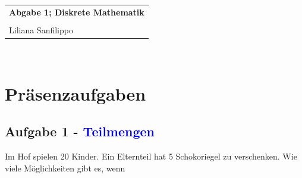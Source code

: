 \documentclass{article} %
\newcommand{\titulo}{Abgabe 1; Diskrete Mathematik}
\newcommand{\nombre}{Liliana Sanfilippo}
\begin{document}
\begin{tabular}{p{12cm}}
{{\Large\bf\titulo}}\\
\vspace{0.2cm}\\
 {\large\nombre}\\
\end{tabular}
\vspace{0.2cm}\\
\section{Präsenzaufgaben}



\subsection{Aufgabe 1 - \textcolor{blue}{Teilmengen}}
Im Hof spielen 20 Kinder. Ein Elternteil hat 5 Schokoriegel zu verschenken. Wie viele Möglichkeiten gibt es, wenn
\end{document}
